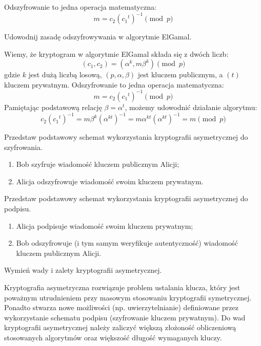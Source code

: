 \documentclass[answers,11pt]{exam}
\begin{document}
\begin{questions}
\begin{solution}
Odszyfrowanie to jedna operacja matematyczna:
\begin{equation}
 m = c_2({c_1}^t)^{-1} \pmod{p}
\end{equation}
\end{solution}

\question Udowodnij zasadę odszyfrowywania w algorytmie ElGamal.
\begin{solution}
Wiemy, że kryptogram w algorytmie ElGamal składa się z dwóch liczb:
\begin{equation}
 (c_1, c_2) = (\alpha^k, m\beta^k) \pmod{p}
\end{equation}
gdzie $k$ jest dużą liczbą losową, $(p,\alpha,\beta)$ jest kluczem publicznym, a $(t)$ kluczem prywatnym. 
Odszyfrowanie to jedna operacja matematyczna:
\begin{equation}
 m = c_2({c_1}^t)^{-1} \pmod{p}
\end{equation}
Pamiętając podstawową relację $\beta=\alpha^t$, możemy udowodnić działanie algorytmu:
\begin{equation}
 c_2({c_1}^t)^{-1} = m\beta^k (\alpha^{kt})^{-1} =  m\alpha^{kt} (\alpha^{kt})^{-1}  = m \pmod{p}
\end{equation}
\end{solution}

\question Przedstaw podstawowy schemat wykorzystania kryptografii asymetrycznej do szyfrowania.
\begin{solution}
\begin{enumerate}
\item Bob szyfruje wiadomość kluczem publicznym Alicji;
\item Alicja odszyfrowuje wiadomość swoim kluczem prywatnym.
\end{enumerate}
\end{solution}

\question Przedstaw podstawowy schemat wykorzystania kryptografii asymetrycznej do podpisu.
\begin{solution}
\begin{enumerate}
\item Alicja podpisuje wiadomość swoim kluczem prywatnym;
\item Bob odszyfrowuje (i tym samym weryfikuje autentyczność) wiadomość kluczem publicznym Alicji.
\end{enumerate}
\end{solution}

\question Wymień wady i zalety kryptografii asymetrycznej.
\begin{solution}
Kryptografia asymetryczna rozwiązuje problem ustalania klucza, który jest poważnym utrudnieniem przy masowym stosowaniu kryptografii symetrycznej. Ponadto stwarza nowe możliwości (np. uwierzytelnianie) definiowane przez wykorzystanie schematu podpisu (szyfrowanie kluczem prywatnym). Do wad kryptografii asymetrycznej należy zaliczyć większą złożoność obliczeniową stosowanych algorytmów oraz większość długość wymaganych kluczy.
\end{solution}



\end{questions}
\end{document}
